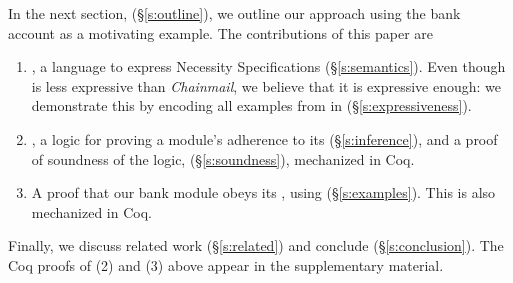 In the next section, (\S\ref{s:outline}),  we outline our approach using the
bank account as  a motivating example. 
%
The contributions of this paper are\begin{enumerate}
 \item
\Chainspec, a language to
express Necessity Specifications (\S\ref{s:semantics}). Even though \Chainspec is
less expressive than  \emph{Chainmail}, we believe that it is expressive enough: we demonstrate this
by encoding all examples from \cite{FASE} in \Chainspec (\S\ref{s:expressiveness}). 
 \item
\Chainlogic, a logic for proving a module's adherence to its
 \NecessitySpecifications (\S\ref{s:inference}), and a proof of soundness of the logic, (\S\ref{s:soundness}),
 mechanized in Coq. 
 \item
A    proof that %
  our bank module obeys its \NecessitySpecification, using   \Chainlogic  (\S\ref{s:examples}). This is also mechanized in Coq.
\end{enumerate}
 
 
 


\noindent Finally, we discuss %
 related work (\S\ref{s:related}) and conclude (\S\ref{s:conclusion}).
The Coq proofs of 
(2) and (3) above %
appear in the
supplementary material.
